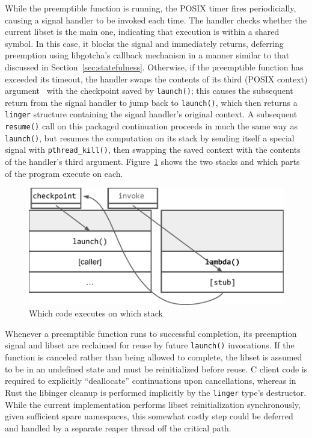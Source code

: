 While the preemptible function is running, the POSIX timer fires periodicially,
causing a signal handler to be invoked each time.  The handler checks whether the
current libset is the main one, indicating that execution is within a shared symbol.
In this case, it blocks the signal and immediately
returns, deferring preemption using libgotcha's callback mechanism in a manner
similar to that discussed in Section~\ref{sec:statefulness}.  Otherwise, if the
preemptible function has exceeded its timeout, the handler swaps the contents of its
third (POSIX context) argument~\cite{sigaction-manpage} with the checkpoint saved by
\texttt{launch()}; this causes the subsequent return from the signal handler to jump
back to \texttt{launch()}, which then returns a \texttt{linger} structure containing
the signal handler's original context.  A subsequent \texttt{resume()} call on this
packaged continuation proceeds in much the same way as \texttt{launch()}, but
resumes the computation on its stack by sending itself a special signal with
\texttt{pthread\_kill()}, then swapping the saved context with the contents of the
handler's third argument.  Figure~\ref{fig:twostacks} shows the two stacks and which
parts of the program execute on each.

\begin{figure}
\includegraphics[width=\columnwidth]{figs/twostacks}
\caption{Which code executes on which stack}
\label{fig:twostacks}
\end{figure}

Whenever a preemptible function runs to successful completion, its preemption signal
and libset are reclaimed for reuse by future \texttt{launch()} invocations.  If the
function is canceled rather than being allowed to complete, the libset is assumed to
be in an undefined state and must be reinitialized before reuse.  C client code is
required to explicitly ``deallocate'' continuations upon cancellations, whereas in
Rust the libinger cleanup is performed implicitly by the \texttt{linger} type's
destructor.  While the current implementation performs libset reinitialization
synchronously, given sufficient spare namespaces, this somewhat costly step could be
deferred and handled by a separate reaper thread off the critical path.

